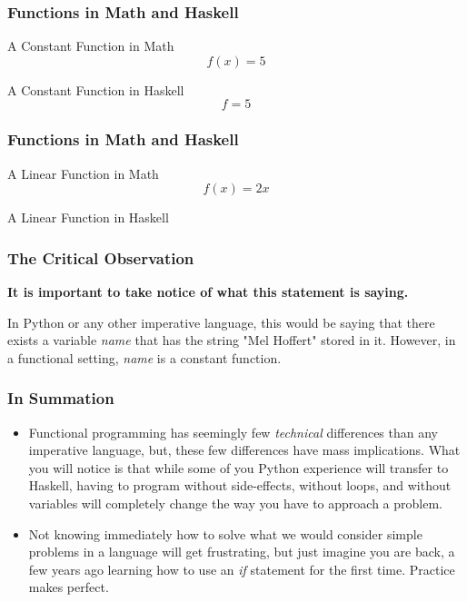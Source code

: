 \documentclass{beamer}
\begin{document}
\begin{frame}
  \frametitle{Functions in Math and Haskell}
  \begin{block}{A Constant Function in Math}
    \[f(x)=5\]
  \end{block}
  \begin{block}{A Constant Function in Haskell}
    \[f=5\]
  \end{block}
\end{frame}

\begin{frame}
  \frametitle{Functions in Math and Haskell}
  \begin{block}{A Linear Function in Math}
    \[f(x)=2x\]
  \end{block}
  \begin{block}{A Linear Function in Haskell}
    
  \end{block}
\end{frame}

\begin{frame}
  \frametitle{The Critical Observation}
  \begin{examples}
    
  \end{examples}
  \textbf{It is important to take notice of what this statement is saying.}

  \vspace{.5cm}
  
  In Python or any other imperative language, this would be saying that there exists a variable \textit{name}
  that has the string "Mel Hoffert" stored in it. However, in a functional setting, \textit{name} is a constant function.
\end{frame}

\begin{frame}
  \frametitle{In Summation}
  \begin{itemize}
  \item
  Functional programming has seemingly few \textit{technical} differences than any imperative language, 
  but, these few differences have mass implications. What you will notice is that while some of you Python experience will
  transfer to Haskell, having to program without side-effects, without loops, and without variables will completely change the way
  you have to approach a problem.
  \item
  Not knowing immediately how to solve what we would consider simple problems in a language will get frustrating, but just imagine you
  are back, a few years ago learning how to use an \textit{if} statement for the first time. Practice makes perfect.
  \end{itemize}
\end{frame}
\end{document}
